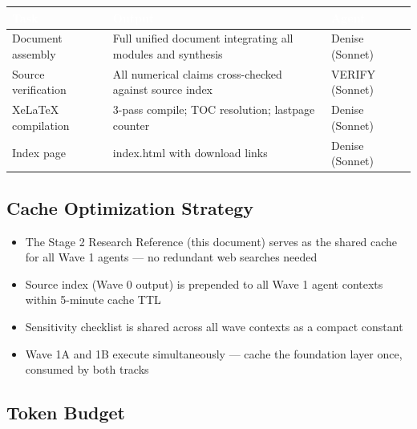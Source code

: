 \documentclass[11pt,letterpaper]{article}
\newcommand{\tableheader}[1]{\textbf{\sffamily\textcolor{white}{#1}}}
\begin{document}
\begin{center}
\begin{tabularx}{\textwidth}{L{4cm}XC{2cm}}
\toprule
{}
\tableheader{Task} & \tableheader{Output} & \tableheader{Agent} \\
\midrule
Document assembly & Full unified document integrating all modules and synthesis & Denise (Sonnet) \\
Source verification & All numerical claims cross-checked against source index & VERIFY (Sonnet) \\
XeLaTeX compilation & 3-pass compile; TOC resolution; lastpage counter & Denise (Sonnet) \\
Index page & index.html with download links & Denise (Sonnet) \\
\bottomrule
\end{tabularx}
\end{center}

\subsection{Cache Optimization Strategy}

\begin{itemize}[leftmargin=*]
  \item The Stage 2 Research Reference (this document) serves as the shared cache for all Wave 1 agents — no redundant web searches needed
  \item Source index (Wave 0 output) is prepended to all Wave 1 agent contexts within 5-minute cache TTL
  \item Sensitivity checklist is shared across all wave contexts as a compact constant
  \item Wave 1A and 1B execute simultaneously — cache the foundation layer once, consumed by both tracks
\end{itemize}

\subsection{Token Budget}
\end{document}
